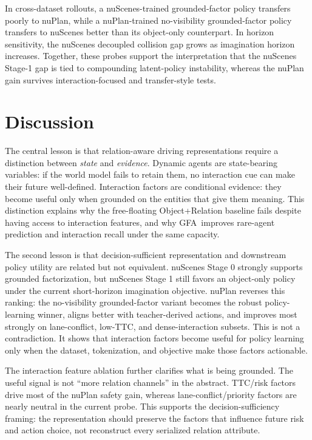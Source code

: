 \documentclass[journal]{IEEEtran}
\newcommand{\method}{\textsc{GFA}}
\begin{document}
In cross-dataset rollouts, a nuScenes-trained grounded-factor policy transfers poorly to nuPlan, while a nuPlan-trained no-visibility grounded-factor policy transfers to nuScenes better than its object-only counterpart. In horizon sensitivity, the nuScenes decoupled collision gap grows as imagination horizon increases. Together, these probes support the interpretation that the nuScenes Stage-1 gap is tied to compounding latent-policy instability, whereas the nuPlan gain survives interaction-focused and transfer-style tests.

\section{Discussion}
The central lesson is that relation-aware driving representations require a distinction between \emph{state} and \emph{evidence}. Dynamic agents are state-bearing variables: if the world model fails to retain them, no interaction cue can make their future well-defined. Interaction factors are conditional evidence: they become useful only when grounded on the entities that give them meaning. This distinction explains why the free-floating Object+Relation baseline fails despite having access to interaction features, and why \method\ improves rare-agent prediction and interaction recall under the same capacity.

The second lesson is that decision-sufficient representation and downstream policy utility are related but not equivalent. nuScenes Stage 0 strongly supports grounded factorization, but nuScenes Stage 1 still favors an object-only policy under the current short-horizon imagination objective. nuPlan reverses this ranking: the no-visibility grounded-factor variant becomes the robust policy-learning winner, aligns better with teacher-derived actions, and improves most strongly on lane-conflict, low-TTC, and dense-interaction subsets. This is not a contradiction. It shows that interaction factors become useful for policy learning only when the dataset, tokenization, and objective make those factors actionable.

The interaction feature ablation further clarifies what is being grounded. The useful signal is not ``more relation channels'' in the abstract. TTC/risk factors drive most of the nuPlan safety gain, whereas lane-conflict/priority factors are nearly neutral in the current probe. This supports the decision-sufficiency framing: the representation should preserve the factors that influence future risk and action choice, not reconstruct every serialized relation attribute.
\end{document}
